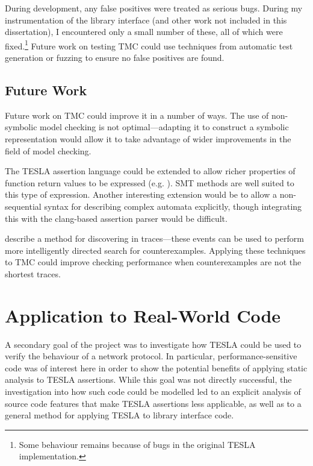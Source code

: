 During development, any false positives were treated as serious bugs. During my
instrumentation of the \lwip{} library interface (and other work not included in
this dissertation), I encountered only a small number of these, all of which
were fixed.\footnote{Some  behaviour remains because of bugs
in the original TESLA implementation.} Future work on testing TMC could use
techniques from automatic test generation or fuzzing to ensure no false
positives are found.

\subsection{Future Work}

Future work on TMC could improve it in a number of ways. The use of non-symbolic
model checking is not optimal---adapting it to construct a symbolic
representation would allow it to take advantage of wider improvements in the
field of model checking. 

The TESLA assertion language could be extended to allow richer properties of
function return values to be expressed (e.g. ). SMT methods are well suited to this type
of expression. Another interesting extension would be to allow a non-sequential
syntax for describing complex automata explicitly, though integrating this with
the clang-based assertion parser would be difficult.

\textcite{kashyap_producing_2008} describe a method for discovering
 in traces---these events can be used to perform more
intelligently directed search for counterexamples. Applying these techniques to
TMC could improve checking performance when counterexamples are not the shortest
traces.

\section{Application to Real-World Code} \label{sec:eval-app}

A secondary goal of the project was to investigate how TESLA could be used to
verify the behaviour of a network protocol. In particular, performance-sensitive
code was of interest here in order to show the potential benefits of applying
static analysis to TESLA assertions. While this goal was not directly
successful, the investigation into how such code could be modelled led to an
explicit analysis of source code features that make TESLA assertions less
applicable, as well as to a general method for applying TESLA to library
interface code.

